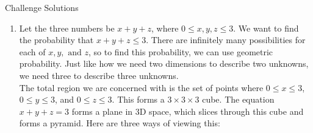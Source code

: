 \documentclass[9pt]{beamer}
\begin{document}
       

\begin{frame}[fragile, t]{Challenge Solutions}
    \begin{enumerate}
        \item Let the three numbers be $x+y+z$, where $0\le x,y,z\le 3$. We want to find the probability that $x+y+z\le 3$. There are infinitely many possibilities for each of $x,y,\text{ and }z$, so to find this probability, we can use geometric probability. Just like how we need two dimensions to describe two unknowns, we need three to describe three unknowns.\\
        \bigskip
        The total region we are concerned with is the set of points where $0\le x\le 3$, $0\le y\le3$, and $0\le z\le 3$. This forms a $3\times3\times3$ cube. The equation $x+y+z=3$ forms a plane in 3D space, which slices through this cube and forms a pyramid. Here are three ways of viewing this:
        

\end{enumerate}
\end{frame}
\end{document}
